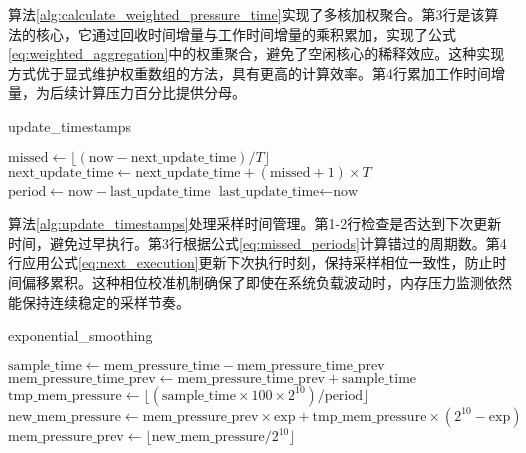 算法\ref{alg:calculate_weighted_pressure_time}实现了多核加权聚合。第3行是该算法的核心，它通过回收时间增量与工作时间增量的乘积累加，实现了公式\ref{eq:weighted_aggregation}中的权重聚合，避免了空闲核心的稀释效应。这种实现方式优于显式维护权重数组的方法，具有更高的计算效率。第4行累加工作时间增量，为后续计算压力百分比提供分母。

\begin{algorithm}[htbp]
\caption{update\_timestamps}
\label{alg:update_timestamps}
\SetAlgoLined
\DontPrintSemicolon
{}
\(\text{missed} \gets \lfloor(\text{now}-\text{next\_update\_time})/T\rfloor\)\;
\(\text{next\_update\_time} \gets \text{next\_update\_time} + (\text{missed}+1) \times T\)\;
\(\text{period}\gets \text{now}-\text{last\_update\_time}\)\;
 \(\text{last\_update\_time}\gets \text{now}\)\;
\end{algorithm}

算法\ref{alg:update_timestamps}处理采样时间管理。第1-2行检查是否达到下次更新时间，避免过早执行。第3行根据公式\ref{eq:missed_periods}计算错过的周期数。第4行应用公式\ref{eq:next_execution}更新下次执行时刻，保持采样相位一致性，防止时间偏移累积。这种相位校准机制确保了即使在系统负载波动时，内存压力监测依然能保持连续稳定的采样节奏。

\begin{algorithm}[htbp]
\caption{exponential\_smoothing}
\label{alg:exponential_smoothing}
\SetAlgoLined
\DontPrintSemicolon
{}

\(\text{sample\_time}\gets \text{mem\_pressure\_time}-\text{mem\_pressure\_time\_prev}\)\;
\(\text{mem\_pressure\_time\_prev} \gets \text{mem\_pressure\_time\_prev} + \text{sample\_time}\)\;
\(\text{tmp\_mem\_pressure}\gets \lfloor(\text{sample\_time}\times 100\times 2^{10})/\text{period}\rfloor\)\;
\(\text{new\_mem\_pressure}\gets \text{mem\_pressure\_prev}\times \text{exp} + \text{tmp\_mem\_pressure}\times(2^{10}-\text{exp})\)\;
\(\text{mem\_pressure\_prev}\gets \lfloor \text{new\_mem\_pressure}/2^{10}\rfloor\)\;
\end{algorithm}

